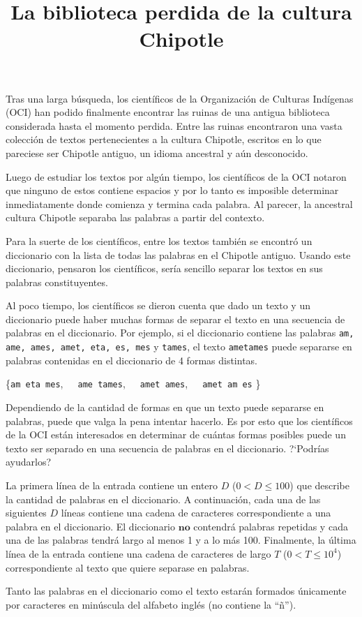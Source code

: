 \documentclass{oci}
\title{La biblioteca perdida de la cultura Chipotle}
\begin{document}
\begin{problemDescription}
Tras una larga búsqueda, los científicos de la Organización de Culturas
Indígenas (OCI) han podido finalmente encontrar las ruinas de una antigua
biblioteca considerada hasta el momento perdida.
Entre las ruinas encontraron una vasta colección de textos pertenecientes a la
cultura Chipotle, escritos en lo que pareciese ser Chipotle antiguo, un idioma
ancestral y aún desconocido.

Luego de estudiar los textos por algún tiempo, los científicos de la OCI notaron
que ninguno de estos contiene espacios y por lo tanto es imposible determinar
inmediatamente donde comienza y termina cada palabra.
Al parecer, la ancestral cultura Chipotle separaba las palabras a partir del
contexto.

Para la suerte de los científicos, entre los textos también se encontró un
diccionario con la lista de todas las palabras en el Chipotle antiguo.
Usando este diccionario, pensaron los científicos, sería sencillo separar los
textos en sus palabras constituyentes.

Al poco tiempo, los científicos se dieron cuenta que dado un texto y un
diccionario puede haber muchas formas de separar el texto en una secuencia de
palabras en el diccionario.
Por ejemplo, si el diccionario contiene las palabras \texttt{am, ame, ames,
  amet, eta, es, mes} y \texttt{tames}, el texto \texttt{ametames}
puede separarse en palabras contenidas en el diccionario de 4 formas distintas.

\begin{center}
\{\texttt{am eta mes},\ \ \  \texttt{ame tames},\ \ \  \texttt{amet ames},\ \ \  \texttt{amet am es}  \}
\end{center}


Dependiendo de la cantidad de formas en que un texto puede separarse en
palabras, puede que valga la pena intentar hacerlo.
Es por esto que los científicos de la OCI están interesados en determinar de
cuántas formas posibles puede un texto ser separado en una secuencia de palabras
en el diccionario.
?`Podrías ayudarlos?
\end{problemDescription}

\begin{inputDescription}
  La primera línea de la entrada contiene un entero $D$ ($0 < D \leq 100$) que
  describe la cantidad de palabras en el diccionario.
  A continuación, cada una de las siguientes $D$ líneas contiene una cadena de
  caracteres correspondiente a una palabra en el diccionario.
  El diccionario $\textbf{no}$ contendrá palabras repetidas y cada una de las
  palabras tendrá largo al menos 1 y a lo más 100.
  Finalmente, la última línea de la entrada contiene una cadena de caracteres de
  largo $T$ ($0 < T \leq 10^4$) correspondiente al texto que quiere separase en
  palabras.

  Tanto las palabras en el diccionario como el texto estarán formados
  únicamente por caracteres en minúscula del alfabeto inglés (no contiene la
  ``ñ'').
\end{inputDescription}
\end{document}
